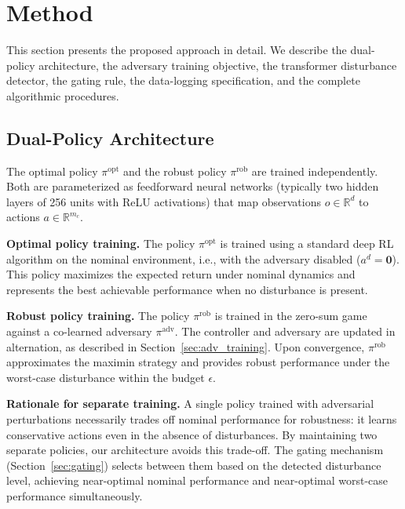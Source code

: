 \documentclass[conference]{IEEEtran}
\newcommand{\R}{\mathbb{R}}
\newcommand{\piopt}{\pi^{\text{opt}}}
\newcommand{\pirob}{\pi^{\text{rob}}}
\newcommand{\piadv}{\pi^{\text{adv}}}
\begin{document}
\section{Method}\label{sec:method}

This section presents the proposed approach in detail.  We describe the
dual-policy architecture, the adversary training objective, the
transformer disturbance detector, the gating rule, the data-logging
specification, and the complete algorithmic procedures.

\subsection{Dual-Policy Architecture}\label{sec:dual_policy}

The optimal policy $\piopt$ and the robust policy $\pirob$ are trained
independently.  Both are parameterized as feedforward neural networks
(typically two hidden layers of 256 units with ReLU activations) that
map observations $o \in \R^d$ to actions $a \in \R^{m_c}$.

\textbf{Optimal policy training.}  The policy $\piopt$ is trained using a
standard deep RL algorithm on the nominal environment,
i.e., with the adversary disabled ($a^d = \boldsymbol{0}$).  This policy
maximizes the expected return under nominal dynamics and represents the
best achievable performance when no disturbance is present.

\textbf{Robust policy training.}  The policy $\pirob$ is trained in the
zero-sum game against a co-learned adversary $\piadv$.  The controller and
adversary are updated in alternation, as described in
Section~\ref{sec:adv_training}.  Upon convergence, $\pirob$ approximates
the maximin strategy and provides robust performance under the worst-case
disturbance within the budget $\epsilon$.

\textbf{Rationale for separate training.}  A single policy trained with
adversarial perturbations necessarily trades off nominal performance for
robustness: it learns conservative actions even in the absence of
disturbances.  By maintaining two separate policies, our architecture
avoids this trade-off.  The gating mechanism (Section~\ref{sec:gating})
selects between them based on the detected disturbance level, achieving
near-optimal nominal performance and near-optimal worst-case performance
simultaneously.
\end{document}
